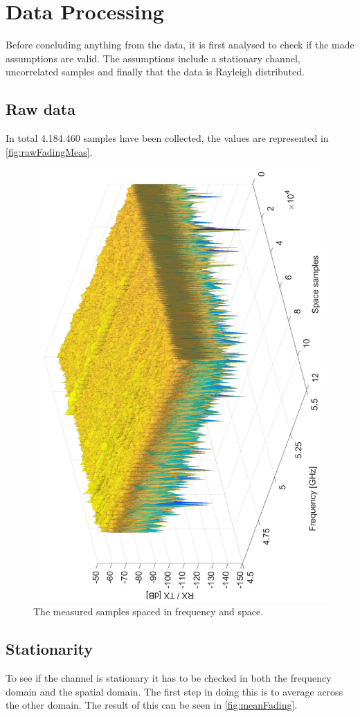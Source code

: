 \section{Data Processing}

Before concluding anything from the data, it is first analysed to check if the made assumptions are valid. The assumptions include a stationary channel, uncorrelated samples and finally that the data is Rayleigh distributed.

\subsection{Raw data}

In total 4.184.460 samples have been collected, the values are represented in \autoref{fig:rawFadingMeas}.

\begin{figure}[H]
\centering
\includegraphics[height = \textwidth, angle = -90]{figures/rawFadingMeas.pdf}
\caption{The measured samples spaced in frequency and space.}
\label{fig:rawFadingMeas}
\end{figure}


\subsection{Stationarity}
To see if the channel is stationary it has to be checked in both the frequency domain and the spatial domain. The first step in doing this is to average across the other domain. The result of this can be seen in \autoref{fig:meanFading}. 

